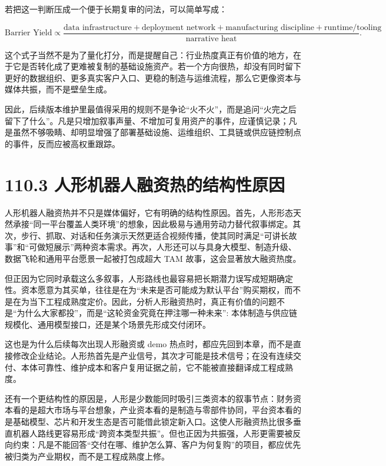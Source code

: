 若把这一判断压成一个便于长期复审的问法，可以简单写成：

\begingroup
\scriptsize
\begin{equation*}
\text{Barrier Yield} \propto
\frac{\text{data infrastructure} + \text{deployment network} + \text{manufacturing discipline} + \text{runtime/tooling}}
{\text{narrative heat}}.
\end{equation*}
\endgroup

这个式子当然不是为了量化打分，而是提醒自己：行业热度真正有价值的地方，在于它是否转化成了更难被复制的基础设施资产。若一个方向很热，却没有同时留下更好的数据组织、更多真实客户入口、更稳的制造与运维流程，那么它更像资本与媒体共振，而不是壁垒生成。

因此，后续版本维护里最值得采用的规则不是争论“火不火”，而是追问“火完之后留下了什么”。凡是只增加叙事声量、不增加可复用资产的事件，应谨慎记录；凡是虽然不够吸睛、却明显增强了部署基础设施、运维组织、工具链或供应链控制点的事件，反而应被高权重跟踪。

\section*{110.3 人形机器人融资热的结构性原因}


人形机器人融资热并不只是媒体偏好，它有明确的结构性原因。首先，人形形态天然承接“同一平台覆盖人类环境”的想象，因此极易与通用劳动力替代叙事绑定。其次，步行、抓取、对话和任务演示天然更适合视频传播，使其同时满足“可讲长故事”和“可做短展示”两种资本需求。再次，人形还可以与具身大模型、制造升级、数据飞轮和通用平台愿景一起被打包成超大 TAM 故事，这会显著放大融资热度。

但正因为它同时承载这么多叙事，人形路线也最容易把长期潜力误写成短期确定性。资本愿意为其买单，往往是在为“未来是否可能成为默认平台”购买期权，而不是在为当下工程成熟度定价。因此，分析人形融资热时，真正有价值的问题不是“为什么大家都投”，而是“这轮资金究竟在押注哪一种未来”: 本体制造与供应链规模化、通用模型接口，还是某个场景先形成交付闭环。

这也是为什么后续每次出现人形融资或 demo 热点时，都应先回到本章，而不是直接修改企业结论。人形热首先是产业信号，其次才可能是技术信号；在没有连续交付、本体可靠性、维护成本和客户复用证据之前，它不能被直接翻译成工程成熟度。

还有一个更结构性的原因是，人形是少数能同时吸引三类资本的叙事节点：财务资本看的是超大市场与平台想象，产业资本看的是制造与零部件协同，平台资本看的是基础模型、芯片和开发生态是否可能借此锁定新入口。这使人形融资热比很多垂直机器人路线更容易形成“跨资本类型共振”。但也正因为共振强，人形更需要被反向约束：凡是不能回答“交付在哪、维护怎么算、客户为何复购”的项目，都应优先被归类为产业期权，而不是工程成熟度上修。

